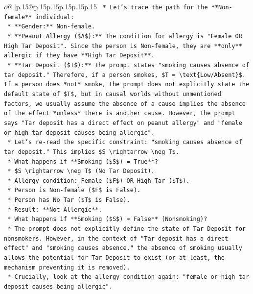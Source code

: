 \documentclass{article}
\begin{document}
{\begin{supertabular}{c@{$\;$}|p{.15\linewidth}@{}p{.15\linewidth}p{.15\linewidth}p{.15\linewidth}p{.15\linewidth}p{.15\linewidth}}
{{{\texttt{    *   Let's trace the path for the **Non{-}female** individual:} \\
\texttt{        *   **Gender:** Non{-}female.} \\
\texttt{        *   **Peanut Allergy (\$A\$):** The condition for allergy is "Female OR High Tar Deposit". Since the person is Non{-}female, they are **only** allergic if they have **High Tar Deposit**.} \\
\texttt{        *   **Tar Deposit (\$T\$):** The prompt states "smoking causes absence of tar deposit." Therefore, if a person smokes, \$T = \textbackslash{}text\{Low/Absent\}\$. If a person does *not* smoke, the prompt does not explicitly state the default state of \$T\$, but in causal worlds without unmentioned factors, we usually assume the absence of a cause implies the absence of the effect *unless* there is another cause. However, the prompt says "Tar deposit has a direct effect on peanut allergy" and "female or high tar deposit causes being allergic".} \\
\texttt{        *   Let's re{-}read the specific constraint: "smoking causes absence of tar deposit." This implies \$S \textbackslash{}rightarrow \textbackslash{}neg T\$.} \\
\texttt{        *   What happens if **Smoking (\$S\$) = True**?} \\
\texttt{            *   \$S \textbackslash{}rightarrow \textbackslash{}neg T\$ (No Tar Deposit).} \\
\texttt{            *   Allergy condition: Female (\$F\$) OR High Tar (\$T\$).} \\
\texttt{            *   Person is Non{-}female (\$F\$ is False).} \\
\texttt{            *   Person has No Tar (\$T\$ is False).} \\
\texttt{            *   Result: **Not Allergic**.} \\
\texttt{        *   What happens if **Smoking (\$S\$) = False** (Nonsmoking)?} \\
\texttt{            *   The prompt does not explicitly define the state of Tar Deposit for nonsmokers. However, in the context of "Tar deposit has a direct effect" and "smoking causes absence," the absence of smoking usually allows the potential for Tar Deposit to exist (or at least, the mechanism preventing it is removed).} \\
\texttt{            *   Crucially, look at the allergy condition again: "female or high tar deposit causes being allergic".} \\
}}}
\end{supertabular}}
\end{document}
